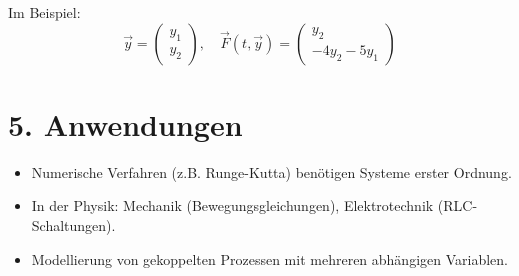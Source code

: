 Im Beispiel:
\[ \vec{y} = \begin{pmatrix} y_1 \\ y_2 \end{pmatrix}, \quad \vec{F}(t,\vec{y}) = \begin{pmatrix} y_2 \\ -4y_2 - 5y_1 \end{pmatrix} \]

\section*{5. Anwendungen}

\begin{itemize}
  \item Numerische Verfahren (z.B. Runge-Kutta) ben\"otigen Systeme erster Ordnung.
  \item In der Physik: Mechanik (Bewegungsgleichungen), Elektrotechnik (RLC-Schaltungen).
  \item Modellierung von gekoppelten Prozessen mit mehreren abh\"angigen Variablen.
\end{itemize}
